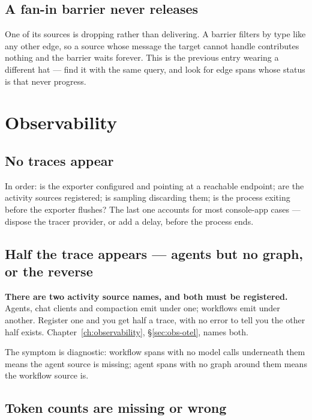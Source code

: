\subsection{A fan-in barrier never releases}

One of its sources is dropping rather than delivering. A barrier filters by type
like any other edge, so a source whose message the target cannot handle
contributes nothing and the barrier waits forever. This is the previous entry
wearing a different hat --- find it with the same query, and look for edge spans
whose status is  that never progress.

\section{Observability}

\subsection{No traces appear}

In order: is the exporter configured and pointing at a reachable endpoint; are
the activity sources registered; is sampling discarding them; is the process
exiting before the exporter flushes? The last one accounts for most console-app
cases --- dispose the tracer provider, or add a delay, before the process ends.

\subsection{Half the trace appears --- agents but no graph, or the reverse}

\textbf{There are two activity source names, and both must be registered.}
Agents, chat clients and compaction emit under one; workflows emit under
another. Register one and you get half a trace, with no error to tell you the
other half exists. Chapter~\ref{ch:observability}, \S\ref{sec:obs-otel}, names
both.

The symptom is diagnostic: workflow spans with no model calls underneath them
means the agent source is missing; agent spans with no graph around them means
the workflow source is.

\subsection{Token counts are missing or wrong}

